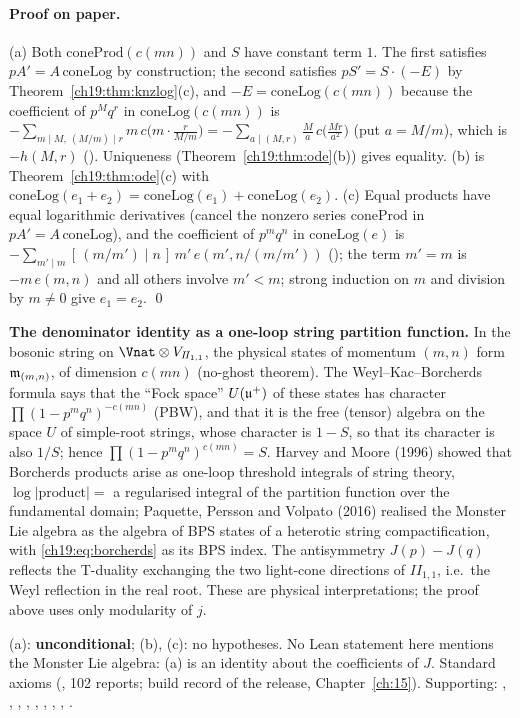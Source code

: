 \paragraph{Proof on paper.}  (a) Both $\mathrm{coneProd}(c(mn))$ and $S$ have constant term $1$.  The first satisfies
$pA'=A\,\mathrm{coneLog}$ by construction; the second satisfies $pS'=S\cdot(-E)$ by Theorem~\ref{ch19:thm:knzlog}(c), and
$-E=\mathrm{coneLog}(c(mn))$ because the coefficient of $p^Mq^r$ in $\mathrm{coneLog}(c(mn))$ is
$-\sum_{m\mid M,\ (M/m)\mid r}m\,c\bigl(m\cdot\frac r{M/m}\bigr)=-\sum_{a\mid(M,r)}\frac Ma\,c\bigl(\frac{Mr}{a^2}\bigr)$ (put $a=M/m$),
which is $-h(M,r)$ ().  Uniqueness (Theorem~\ref{ch19:thm:ode}(b)) gives equality.  (b) is
Theorem~\ref{ch19:thm:ode}(c) with $\mathrm{coneLog}(e_1+e_2)=\mathrm{coneLog}(e_1)+\mathrm{coneLog}(e_2)$.  (c) Equal products have
equal logarithmic derivatives (cancel the nonzero series $\mathrm{coneProd}$ in $pA'=A\,\mathrm{coneLog}$), and the coefficient
of $p^mq^n$ in $\mathrm{coneLog}(e)$ is $-\sum_{m'\mid m}[\,(m/m')\mid n\,]\,m'\,e(m',n/(m/m'))$ (); the term
$m'=m$ is $-m\,e(m,n)$ and all others involve $m'<m$; strong induction on $m$ and division by $m\ne0$ give $e_1=e_2$. \qed
\begin{physics}
\textbf{The denominator identity as a one-loop string partition function.}  In the bosonic string on
$\Vnat\otimes V_{I\!I_{1,1}}$, the physical states of momentum $(m,n)$ form $\mathfrak{m}_{(m,n)}$, of dimension $c(mn)$ (no-ghost
theorem).  The Weyl--Kac--Borcherds formula says that the ``Fock space'' $U(\mathfrak{u}^+)$ of these states has character
$\prod(1-p^mq^n)^{-c(mn)}$ (PBW), and that it is the free (tensor) algebra on the space $U$ of simple-root strings, whose
character is $1-S$, so that its character is also $1/S$; hence $\prod(1-p^mq^n)^{c(mn)}=S$.  Harvey and Moore (1996) showed that Borcherds products arise as one-loop
threshold integrals of string theory, $\log|\text{product}|=$ a regularised integral of the partition function over the
fundamental domain; Paquette, Persson and Volpato (2016) realised the Monster Lie algebra as the algebra of BPS states of
a heterotic string compactification, with \eqref{ch19:eq:borcherds} as its BPS index.  The antisymmetry $J(p)-J(q)$
reflects the T-duality exchanging the two light-cone directions of $I\!I_{1,1}$, i.e.\ the Weyl reflection in the real
root.  These are physical interpretations; the proof above uses only modularity of $j$.
\end{physics}
\begin{status}
(a): \textbf{unconditional}; (b), (c): no hypotheses.  No Lean statement here mentions the Monster Lie algebra: (a) is an
identity about the coefficients of $J$.  Standard axioms (, 102 reports;
build record of the release, Chapter~\ref{ch:15}).  Supporting: ,
, , , ,
, , , .
\end{status}

